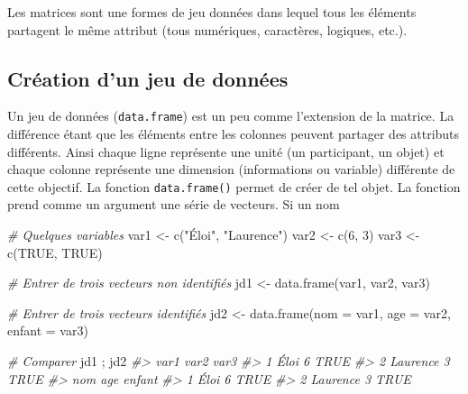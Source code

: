 \documentclass[
]{book}
\newenvironment{Shaded}{}{}
\newcommand{\AttributeTok}[1]{#1}
\newcommand{\CommentTok}[1]{\textit{#1}}
\newcommand{\ConstantTok}[1]{#1}
\newcommand{\DecValTok}[1]{#1}
\newcommand{\FunctionTok}[1]{#1}
\newcommand{\NormalTok}[1]{#1}
\newcommand{\OtherTok}[1]{#1}
\newcommand{\StringTok}[1]{#1}
\begin{document}
Les matrices sont une formes de jeu données dans lequel tous les éléments partagent le même attribut (tous numériques, caractères, logiques, etc.).

\hypertarget{cruxe9ation-dun-jeu-de-donnuxe9es}{%
\subsection{Création d'un jeu de données}\label{cruxe9ation-dun-jeu-de-donnuxe9es}}

Un jeu de données (\texttt{data.frame}) est un peu comme l'extension de la matrice. La différence étant que les éléments entre les colonnes peuvent partager des attributs différents. Ainsi chaque ligne représente une unité (un participant, un objet) et chaque colonne représente une dimension (informations ou variable) différente de cette objectif. La fonction \texttt{data.frame()} permet de créer de tel objet. La fonction prend comme un argument une série de vecteurs. Si un nom

\begin{Shaded}
\begin{Highlighting}[]
\CommentTok{\# Quelques variables}
\NormalTok{var1 }\OtherTok{\textless{}{-}} \FunctionTok{c}\NormalTok{(}\StringTok{"Éloi"}\NormalTok{, }\StringTok{"Laurence"}\NormalTok{)}
\NormalTok{var2 }\OtherTok{\textless{}{-}} \FunctionTok{c}\NormalTok{(}\DecValTok{6}\NormalTok{, }\DecValTok{3}\NormalTok{)}
\NormalTok{var3 }\OtherTok{\textless{}{-}} \FunctionTok{c}\NormalTok{(}\ConstantTok{TRUE}\NormalTok{, }\ConstantTok{TRUE}\NormalTok{)}

\CommentTok{\# Entrer de trois vecteurs non identifiés}
\NormalTok{jd1 }\OtherTok{\textless{}{-}} \FunctionTok{data.frame}\NormalTok{(var1, var2, var3)}

\CommentTok{\# Entrer de trois vecteurs identifiés}
\NormalTok{jd2 }\OtherTok{\textless{}{-}} \FunctionTok{data.frame}\NormalTok{(}\AttributeTok{nom =}\NormalTok{ var1, }\AttributeTok{age =}\NormalTok{ var2, }\AttributeTok{enfant =}\NormalTok{ var3)}

\CommentTok{\# Comparer}
\NormalTok{jd1 ; jd2}
\CommentTok{\#\textgreater{}       var1 var2 var3}
\CommentTok{\#\textgreater{} 1     Éloi    6 TRUE}
\CommentTok{\#\textgreater{} 2 Laurence    3 TRUE}
\CommentTok{\#\textgreater{}        nom age enfant}
\CommentTok{\#\textgreater{} 1     Éloi   6   TRUE}
\CommentTok{\#\textgreater{} 2 Laurence   3   TRUE}
\end{Highlighting}
\end{Shaded}
\end{document}
